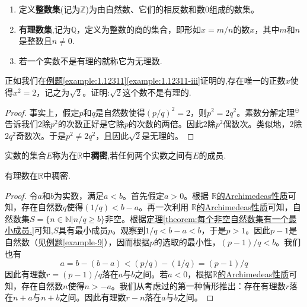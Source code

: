 \documentclass[lang=cn,newtx,10pt,scheme=chinese]{../Template/elegantbook}
\begin{document}
\begin{definition}\label{definition:整数集、有理数集和无理数}
\begin{enumerate}
  \item 定义\textbf{整数集}(记为\(\mathbb{Z}\))为由自然数、它们的相反数和数\(0\)组成的数集。
  \item \textbf{有理数集},记为\(\mathbb{Q}\)，定义为整数的商的集合，即形如\(x = m/n\)的数\(x\)，其中\(m\)和\(n\)是整数且\(n\neq0\).
  \item 若一个实数不是有理的就称它为无理数.
\end{enumerate}
\end{definition}

\begin{example}
  正如我们在\hyperref[example:1.12311-iii]{例题\ref{example:1.12311}\ref{example:1.12311-iii}}证明的,存在唯一的正数\(x\)使得\(x^2 = 2\)，记之为\(\sqrt{2}\)。证明:\(\sqrt{2}\)这个数不是有理的.
\end{example}
\begin{proof}
  事实上，假定\(p\)和\(q\)是自然数使得\((p/q)^2 = 2\)，则\(p^2 = 2q^2\)。素数分解定理$^{\ominus}$告诉我们\(2\)除\(p^2\)的次数正好是它除\(p\)的次数的两倍。因此\(2\)除\(p^2\)偶数次。类似地，\(2\)除\(2q^2\)奇数次。于是\(p^2\neq2q^2\)，且因此\(\sqrt{2}\)是无理的。

\end{proof}

\begin{definition}[稠密]\label{definition:稠密}
  实数的集合\(E\)称为在\(\mathbb{R}\)中\textbf{稠密},若任何两个实数之间有\(E\)的成员.
\end{definition}

\begin{theorem}[有理数的稠密性]\label{theorem:有理数的稠密性}
  有理数在\(\mathbb{R}\)中稠密.
\end{theorem}
\begin{proof}
  令\(a\)和\(b\)为实数，满足\(a < b\)。首先假定\(a>0\)。根据 \hyperref[theorem:实数的Archimedeas性质]{\(\mathbb{R}\)的Archimedeas性质}可知，存在自然数\(q\)使得\((1/q)<b - a\)。再一次利用 \hyperref[theorem:实数的Archimedeas性质]{\(\mathbb{R}\)的Archimedeas性质}可知，自然数集\(S=\{n\in\mathbb{N}|n/q\geqslant b\}\)非空。根据\hyperref[theorem:每个非空自然数集有一个最小成员.]{定理\ref{theorem:每个非空自然数集有一个最小成员.}}可知,\(S\)具有最小成员\(p\)。观察到\(1/q<b - a<b\)，于是\(p>1\)。因此\(p - 1\)是自然数（见\hyperref[example-9]{例题\ref{example-9}}），因而根据\(p\)的选取的最小性，\((p - 1)/q<b\)。我们也有
\[
a = b-(b - a)<(p/q)-(1/q)=(p - 1)/q
\]
因此有理数\(r=(p - 1)/q\)落在\(a\)与\(b\)之间。若\(a<0\)，根据\hyperref[theorem:实数的Archimedeas性质]{\(\mathbb{R}\)的Archimedeas性质}可知，存在自然数\(n\)使得\(n>-a\)。我们从考虑过的第一种情形推出：存在有理数\(r\)落在\(n + a\)与\(n + b\)之间。因此有理数\(r - n\)落在\(a\)与\(b\)之间。

\end{proof}
\end{document}
